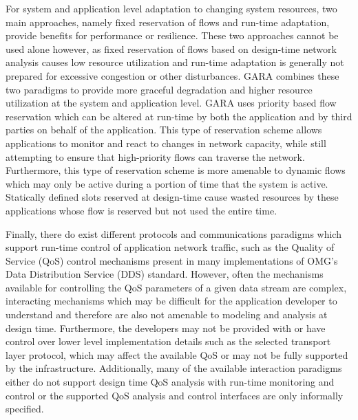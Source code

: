 For system and application level adaptation to changing system resources, two main approaches, namely fixed reservation of flows and run-time adaptation, provide benefits for performance or resilience.  These two approaches cannot be used alone however, as fixed reservation of flows based on design-time network analysis causes low resource utilization and run-time adaptation is generally not prepared for excessive congestion or other disturbances.  GARA \cite{Foster2000} combines these two paradigms to provide more graceful degradation and higher resource utilization at the system and application level.  GARA uses priority based flow reservation which can be altered at run-time by both the application and by third parties on behalf of the application.  This type of reservation scheme allows applications to monitor and react to changes in network capacity, while still attempting to ensure that high-priority flows can traverse the network.  Furthermore, this type of reservation scheme is more amenable to dynamic flows which may only be active during a portion of time that the system is active.  Statically defined slots reserved at design-time cause wasted resources by these applications whose flow is reserved but not used the entire time.  


Finally, there do exist different protocols and communications paradigms which support run-time control of application network traffic, such as the Quality of Service (QoS) control mechanisms present in many implementations of OMG's Data Distribution Service (DDS) standard\cite{OMG-DDS:07}\cite{OpenDDS:07}.  However, often the mechanisms available for controlling the QoS parameters of a given data stream are complex, interacting mechanisms which may be difficult for the application developer to understand and therefore are also not amenable to modeling and analysis at design time\cite{Hoffert:2010:AED:1862821.1862825}.  Furthermore, the developers may not be provided with or have control over lower level implementation details such as the selected transport layer protocol, which may affect the available QoS or may not be fully supported by the infrastructure.  Additionally, many of the available interaction paradigms either do not support design time QoS analysis with run-time monitoring and control or the supported QoS analysis and control interfaces are only informally specified.
